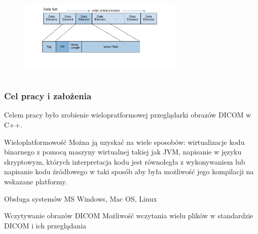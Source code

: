 \documentclass[aspectratio=169]{beamer}
\begin{document}
\begin{frame}[t]
\begin{columns}[t]
        \begin{figure}
            \includegraphics[trim={1.2cm 1cm 1.2cm 0.2cm},clip,width=0.7\textwidth]{img/dicom-dataelement002.pdf}
        \end{figure}

    \end{columns}
\end{frame}

\begin{frame}
    \frametitle{Cel pracy i założenia}

    \begin{alertblock}{}
        Celem pracy było zrobienie wielopratformowej przeglądarki obrazów DICOM w C++.
    \end{alertblock}

    \begin{block}{Wieloplatformowość}
        Można ją uzyskać na wiele sposobów: wirtualizacje kodu binarnego z pomocą maszyny wirtualnej takiej jak JVM, napisanie w języku skryptowym, których interpretacja kodu jest równoległa z wykonywaniem lub napisanie kodu źródłowego w taki sposób aby była możliwość jego kompilacji na wskazane platformy.
    \end{block}

    \begin{block}{Obsługa systemów}
        MS Windows, Mac OS, Linux
    \end{block}

    \begin{block}{Wczytywanie obrazów DICOM}
        Możliwość wczytania wielu plików w standardzie DICOM i ich przeglądania
    \end{block}

\end{frame}
\end{document}
